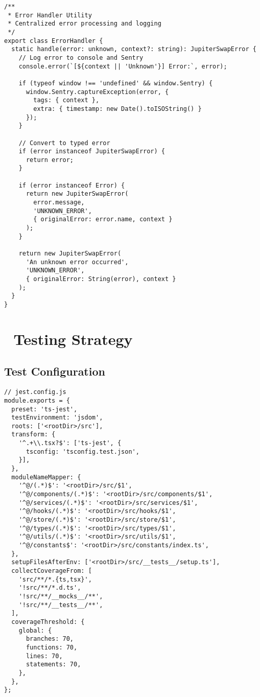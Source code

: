 \documentclass[11pt,a4paper]{article}
\begin{document}
\begin{lstlisting}[style=typescript, caption=Typed Error System]
/**
 * Error Handler Utility
 * Centralized error processing and logging
 */
export class ErrorHandler {
  static handle(error: unknown, context?: string): JupiterSwapError {
    // Log error to console and Sentry
    console.error(`[${context || 'Unknown'}] Error:`, error);
    
    if (typeof window !== 'undefined' && window.Sentry) {
      window.Sentry.captureException(error, {
        tags: { context },
        extra: { timestamp: new Date().toISOString() }
      });
    }

    // Convert to typed error
    if (error instanceof JupiterSwapError) {
      return error;
    }

    if (error instanceof Error) {
      return new JupiterSwapError(
        error.message,
        'UNKNOWN_ERROR',
        { originalError: error.name, context }
      );
    }

    return new JupiterSwapError(
      'An unknown error occurred',
      'UNKNOWN_ERROR',
      { originalError: String(error), context }
    );
  }
}
\end{lstlisting}

\section{🧪 Testing Strategy}

\subsection{Test Configuration}

\begin{lstlisting}[style=typescript, caption=Jest Configuration with Mocks]
// jest.config.js
module.exports = {
  preset: 'ts-jest',
  testEnvironment: 'jsdom',
  roots: ['<rootDir>/src'],
  transform: {
    '^.+\\.tsx?$': ['ts-jest', {
      tsconfig: 'tsconfig.test.json',
    }],
  },
  moduleNameMapper: {
    '^@/(.*)$': '<rootDir>/src/$1',
    '^@/components/(.*)$': '<rootDir>/src/components/$1',
    '^@/services/(.*)$': '<rootDir>/src/services/$1',
    '^@/hooks/(.*)$': '<rootDir>/src/hooks/$1',
    '^@/store/(.*)$': '<rootDir>/src/store/$1',
    '^@/types/(.*)$': '<rootDir>/src/types/$1',
    '^@/utils/(.*)$': '<rootDir>/src/utils/$1',
    '^@/constants$': '<rootDir>/src/constants/index.ts',
  },
  setupFilesAfterEnv: ['<rootDir>/src/__tests__/setup.ts'],
  collectCoverageFrom: [
    'src/**/*.{ts,tsx}',
    '!src/**/*.d.ts',
    '!src/**/__mocks__/**',
    '!src/**/__tests__/**',
  ],
  coverageThreshold: {
    global: {
      branches: 70,
      functions: 70,
      lines: 70,
      statements: 70,
    },
  },
};
\end{lstlisting}
\end{document}
